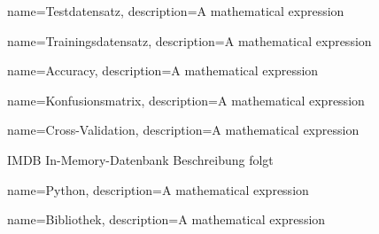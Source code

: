 {
        name=Testdatensatz,
        description={A mathematical expression}
}

{
        name=Trainingsdatensatz,
        description={A mathematical expression}
}

{
        name=Accuracy,
        description={A mathematical expression}
}

{
        name=Konfusionsmatrix,
        description={A mathematical expression}
}

{
        name=Cross-Validation,
        description={A mathematical expression}
}


\newglossaryentrywithacronym
{IMDB}
{In-Memory-Datenbank}
{Beschreibung folgt}



{
        name=Python,
        description={A mathematical expression}
}

{
        name=Bibliothek,
        description={A mathematical expression}
}












